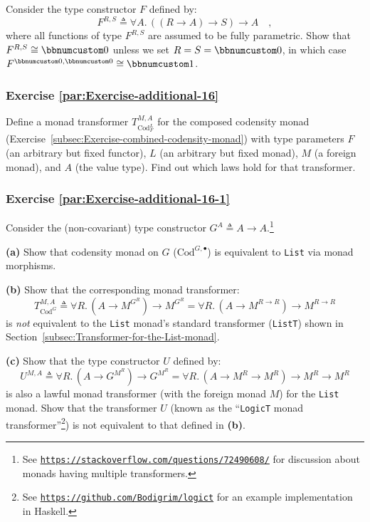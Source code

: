 Consider the type constructor $F$ defined by:
\[
F^{R,S}\triangleq\forall A.\,((R\rightarrow A)\rightarrow S)\rightarrow A\quad,
\]
where all functions of type $F^{R,S}$ are assumed to be fully parametric.
Show that $F^{R,S}\cong\bbnum 0$ unless we set $R=S=\bbnum 0$, in
which case $F^{\bbnum 0,\bbnum 0}\cong\bbnum 1$. 

\subsubsection{Exercise \label{par:Exercise-additional-16}\ref{par:Exercise-additional-16}}

Define a monad transformer $T_{\text{Cod}_{F}^{L}}^{M,A}$ for the
composed codensity monad (Exercise~\ref{subsec:Exercise-combined-codensity-monad})
with type parameters $F$ (an arbitrary but fixed functor), $L$ (an
arbitrary but fixed monad), $M$ (a foreign monad), and $A$ (the
value type). Find out which laws hold for that transformer.

\subsubsection{Exercise \label{par:Exercise-additional-16-1}\ref{par:Exercise-additional-16-1}}

Consider the (non-covariant) type constructor $G^{A}\triangleq A\rightarrow A$.\footnote{See \texttt{\href{https://stackoverflow.com/questions/72490608/}{https://stackoverflow.com/questions/72490608/}}
for discussion about monads having multiple transformers.}

\textbf{(a)} Show that codensity monad on $G$ ($\text{Cod}^{G,\bullet}$)
is equivalent to \lstinline!List! via monad morphisms.

\textbf{(b)} Show that the corresponding monad transformer: 
\[
T_{\text{Cod}^{G}}^{M,A}\triangleq\forall R.\,(A\rightarrow M^{G^{R}})\rightarrow M^{G^{R}}=\forall R.\,(A\rightarrow M^{R\rightarrow R})\rightarrow M^{R\rightarrow R}
\]
is \emph{not} equivalent to the \lstinline!List! monad\textsf{'}s standard
transformer (\lstinline!ListT!) shown in Section~\ref{subsec:Transformer-for-the-List-monad}.

\textbf{(c)} Show that the type constructor $U$ defined by:
\[
U^{M,A}\triangleq\forall R.\,(A\rightarrow G^{M^{R}})\rightarrow G^{M^{R}}=\forall R.\,(A\rightarrow M^{R}\rightarrow M^{R})\rightarrow M^{R}\rightarrow M^{R}
\]
is also a lawful monad transformer (with the foreign monad $M$) for
the \lstinline!List! monad. Show that the transformer $U$ (known
as the \textsf{``}\lstinline!LogicT! monad transformer\textsf{''}\footnote{See \texttt{\href{https://github.com/Bodigrim/logict}{https://github.com/Bodigrim/logict}}
for an example implementation in Haskell.}) is not equivalent to that defined in \textbf{(b)}. 

